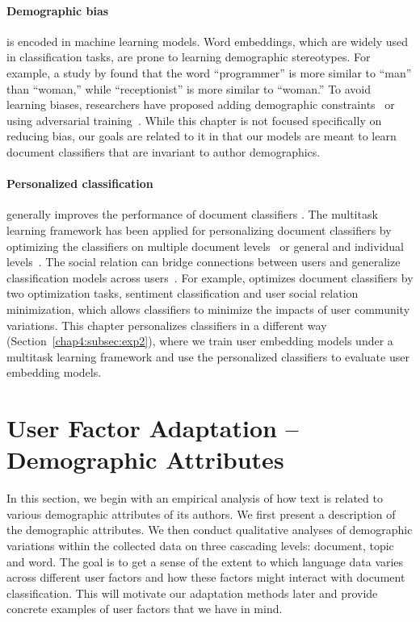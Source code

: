 \paragraph{Demographic bias}
is encoded in machine learning models. Word embeddings, which are widely used in classification tasks, are prone to learning demographic stereotypes. 
For example, a study by \cite{bolukbasi2016man} found that the word ``programmer'' is more similar to ``man'' than ``woman,'' while ``receptionist'' is more similar to ``woman.''
To avoid learning biases, researchers have proposed adding demographic constraints~\cite{zhao2017men} or using adversarial training~\cite{elazar2018adversarial}. 
While this chapter is not focused specifically on reducing bias,
our goals are related to it in that our models are meant to learn document classifiers that are invariant to author demographics.

\paragraph{Personalized classification} 
generally improves the performance of document classifiers \cite{flek2020returning}.
The multitask learning framework has been applied for personalizing document classifiers by optimizing the classifiers on multiple document levels~\cite{benton2017multitask} or general and individual levels~\cite{wu2016personalized}.
The social relation can bridge connections between users and generalize classification models across users~\cite{wu2016personalized, yang2017overcoming}. 
For example, \cite{wu2016personalized} optimizes document classifiers by two optimization tasks, sentiment classification and user social relation minimization, which allows classifiers to minimize the impacts of user community variations.
This chapter personalizes classifiers in a different way (Section~\ref{chap4:subsec:exp2}), where we train user embedding models under a multitask learning framework and use the personalized classifiers to evaluate user embedding models.


\section{User Factor Adaptation -- Demographic Attributes}
\label{chap4:sec:daa}

In this section, we begin with an empirical analysis of how text is related to various demographic attributes of its authors. We first present a description of the demographic attributes. We then conduct qualitative analyses of demographic variations within the collected data on three cascading levels: document, topic and word.
The goal is to get a sense of the extent to which language data varies across different user factors and how these factors might interact with document classification. 
This will motivate our adaptation methods later and provide concrete examples of user factors that we have in mind.


